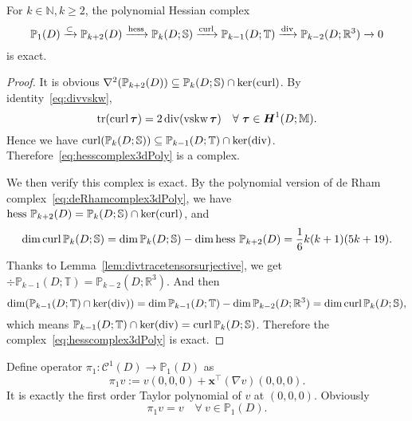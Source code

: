 \begin{lemma}
For $k\in \mathbb N, k\geq 2$, the polynomial Hessian complex
\begin{equation}\label{eq:hesscomplex3dPoly}
\mathbb P_1(D)\xrightarrow{\subset} \mathbb P_{k+2}(D)\xrightarrow{\operatorname{hess}}\mathbb P_{k}(D;\mathbb S)\xrightarrow{\operatorname{curl}} \mathbb P_{k-1}(D;\mathbb T) \xrightarrow{\operatorname{div}} \mathbb P_{k-2}(D;\mathbb R^3)\xrightarrow{}0
\end{equation}
is exact.
\end{lemma}
\begin{proof}
It is obvious $\nabla^2(\mathbb P_{k+2}(D))\subseteq \mathbb P_{k}(D;\mathbb S)\cap \ker(\operatorname{curl})$. By identity~\eqref{eq:divvskw},
$$\operatorname*{tr}(\operatorname{curl}\boldsymbol\tau)=2\operatorname{div}(\operatorname{vskw}\boldsymbol\tau)\quad\forall~\boldsymbol\tau\in\boldsymbol H^1(D;\mathbb M).$$
Hence we have $\operatorname{curl} (\mathbb P_{k}(D;\mathbb S))\subseteq \mathbb P_{k-1}(D;\mathbb T) \cap \ker(\operatorname{div})$. Therefore~\eqref{eq:hesscomplex3dPoly} is a complex.

We then verify this complex is exact. By the polynomial version of de Rham complex~\eqref{eq:deRhamcomplex3dPoly}, we have $\operatorname{hess}\,\mathbb P_{k+2}(D)=\mathbb P_{k}(D;\mathbb S)\cap\ker(\operatorname{curl})$, and
\[
\dim\operatorname{curl}\mathbb P_{k}(D;\mathbb S)=\dim\mathbb P_{k}(D;\mathbb S)-\dim\operatorname{hess}\,\mathbb P_{k+2}(D)=\frac{1}{6}k(k+1)(5k+19).
\]
Thanks to Lemma~\ref{lem:divtracetensorsurjective}, we get $\div\mathbb P_{k-1}(D;\mathbb T)=\mathbb P_{k-2}(D;\mathbb R^3)$. And then
\[
\dim(\mathbb P_{k-1}(D;\mathbb T)\cap\ker(\operatorname{div}))=\dim\mathbb P_{k-1}(D;\mathbb T)-\dim\mathbb P_{k-2}(D;\mathbb R^3)=\dim\operatorname{curl}\mathbb P_{k}(D;\mathbb S),
\]
which means $\mathbb P_{k-1}(D;\mathbb T)\cap\ker(\operatorname{div})=\operatorname{curl}\mathbb P_{k}(D;\mathbb S)$.
Therefore the complex~\eqref{eq:hesscomplex3dPoly} is exact.
\end{proof}

Define operator $\pi_{1}: \mathcal C^1(D)\to\mathbb P_{1}(D)$ as
\[
\pi_{1}v:=v(0,0,0)+\boldsymbol x^{\intercal}(\nabla v)(0,0,0).
\]
It is exactly the first order Taylor polynomial of $v$ at $(0,0,0)$. 
Obviously
\begin{equation}\label{eq:pi1prop}
\pi_{1}v=v\quad \forall~v\in\mathbb P_{1}(D).
\end{equation}

